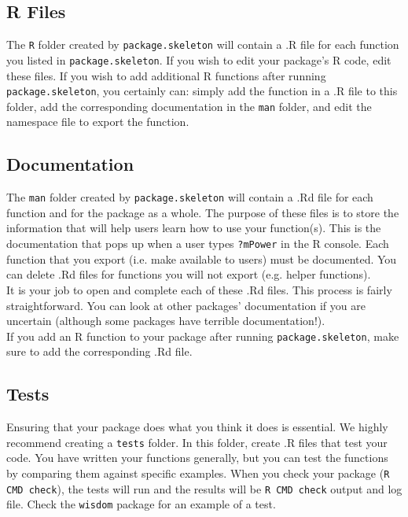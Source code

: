 \documentclass{article}
\begin{document}
\subsection{R Files} 
The \texttt{R} folder created by  \texttt{package.skeleton} will contain a .R file for each function you listed in   \texttt{package.skeleton}. If you wish to edit your package's R code, edit these files. If you wish to add additional R functions after running  \texttt{package.skeleton}, you certainly can: simply add the function in a .R file to this folder, add the corresponding documentation in the \texttt{man} folder, and edit the namespace file to export the function.

\subsection{Documentation}
The \texttt{man} folder created by  \texttt{package.skeleton} will contain a .Rd file for each function and for the package as a whole.  The purpose of these files is to store the information that will help users learn how to use your function(s). This is the documentation that pops up when a user types \texttt{?mPower} in the R console. Each function that you export (i.e. make available to users) must be documented. You can delete .Rd files for functions you will not export (e.g. helper functions).  \\

It is your job to open and complete each of these  .Rd files. This process is fairly straightforward. You can look at other packages'  documentation if you are uncertain (although some packages have terrible documentation!). \\

If you add an R function to your package after running \texttt{package.skeleton}, make sure to add the corresponding .Rd file.


\subsection{Tests}\label{sec:tests} Ensuring that your package does what you think it does is essential. We highly recommend creating a \texttt{tests} folder. In this folder, create .R files that test your code. 
You have written your functions generally, but you can test the functions by comparing them against specific examples. When you check your package (\texttt{R CMD check}), the tests will run and the results will be  \texttt{R CMD check} output and log file. Check the \texttt{wisdom} package for an example of a test. \\
\end{document}
